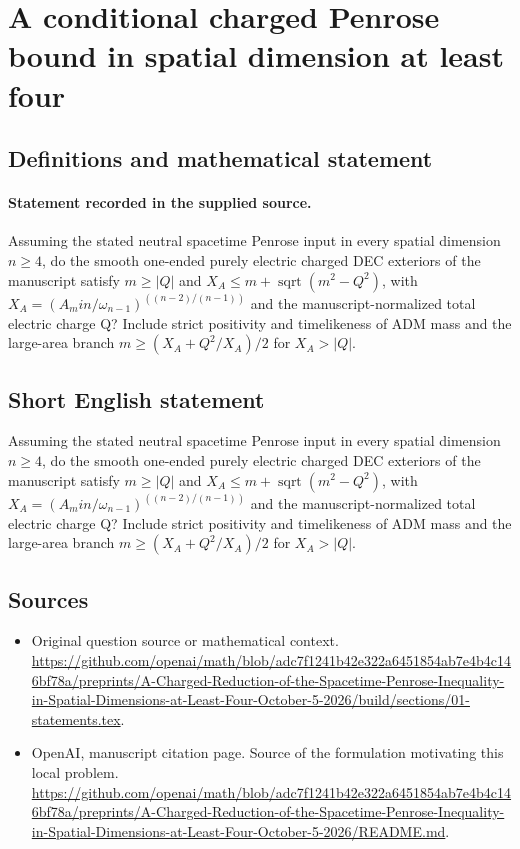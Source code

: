 \documentclass[11pt]{article}
\begin{document}
\section*{A conditional charged Penrose bound in spatial dimension at least four}\label{30007215}
\subsection{Definitions and mathematical statement}
\paragraph{Statement recorded in the supplied source.}
Assuming the stated neutral spacetime Penrose input in every spatial dimension $n\geq 4$, do the smooth one-ended purely electric charged DEC exteriors of the manuscript satisfy $m\geq |Q|$ and $X_A\leq m+\operatorname{sqrt}(m^2-Q^2)$, with $X_A=(A_min/\omega _{n-1})^((n-2)/(n-1))$ and the manuscript-normalized total electric charge Q? Include strict positivity and timelikeness of ADM mass and the large-area branch $m\geq (X_A+Q^2/X_A)/2$ for $X_A>|Q|$.
\subsection{Short English statement}
Assuming the stated neutral spacetime Penrose input in every spatial dimension $n\geq 4$, do the smooth one-ended purely electric charged DEC exteriors of the manuscript satisfy $m\geq |Q|$ and $X_A\leq m+\operatorname{sqrt}(m^2-Q^2)$, with $X_A=(A_min/\omega _{n-1})^((n-2)/(n-1))$ and the manuscript-normalized total electric charge Q? Include strict positivity and timelikeness of ADM mass and the large-area branch $m\geq (X_A+Q^2/X_A)/2$ for $X_A>|Q|$.
\subsection{Sources}
\begin{itemize}
\item[S1] Original question source or mathematical context.
\url{https://github.com/openai/math/blob/adc7f1241b42e322a6451854ab7e4b4c146bf78a/preprints/A-Charged-Reduction-of-the-Spacetime-Penrose-Inequality-in-Spatial-Dimensions-at-Least-Four-October-5-2026/build/sections/01-statements.tex}.
\item[S2] OpenAI, manuscript citation page. Source of the formulation motivating this local problem.
\url{https://github.com/openai/math/blob/adc7f1241b42e322a6451854ab7e4b4c146bf78a/preprints/A-Charged-Reduction-of-the-Spacetime-Penrose-Inequality-in-Spatial-Dimensions-at-Least-Four-October-5-2026/README.md}.
\end{itemize}
\end{document}
